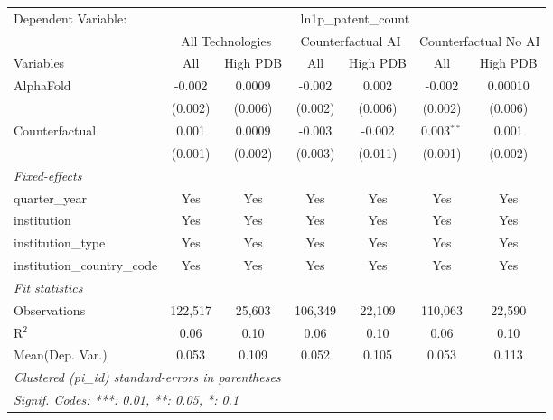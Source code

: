 \begingroup
\centering
\begin{tabular}{lcccccc}
   \tabularnewline \midrule \midrule
   Dependent Variable: & \multicolumn{6}{c}{ln1p\_patent\_count}\\
 & \multicolumn{2}{c}{All Technologies} & \multicolumn{2}{c}{Counterfactual AI} & \multicolumn{2}{c}{Counterfactual No AI} \\
\cmidrule(lr){1-1}\cmidrule(lr){2-3} \cmidrule(lr){4-5} \cmidrule(lr){6-7}
Variables & \multicolumn{1}{c}{All} & \multicolumn{1}{c}{High PDB} & \multicolumn{1}{c}{All} & \multicolumn{1}{c}{High PDB} & \multicolumn{1}{c}{All} & \multicolumn{1}{c}{High PDB} \\
\cmidrule(lr){1-1}\cmidrule(lr){2-2} \cmidrule(lr){3-3} \cmidrule(lr){4-4} \cmidrule(lr){5-5} \cmidrule(lr){6-6} \cmidrule(lr){7-7}
   AlphaFold                    & -0.002  & 0.0009  & -0.002  & 0.002   & -0.002       & 0.00010\\   
                                & (0.002) & (0.006) & (0.002) & (0.006) & (0.002)      & (0.006)\\   
   Counterfactual               & 0.001   & 0.0009  & -0.003  & -0.002  & 0.003$^{**}$ & 0.001\\   
                                & (0.001) & (0.002) & (0.003) & (0.011) & (0.001)      & (0.002)\\   
   \midrule
   \emph{Fixed-effects}\\
   quarter\_year                & Yes     & Yes     & Yes     & Yes     & Yes          & Yes\\  
   institution                  & Yes     & Yes     & Yes     & Yes     & Yes          & Yes\\  
   institution\_type            & Yes     & Yes     & Yes     & Yes     & Yes          & Yes\\  
   institution\_country\_code   & Yes     & Yes     & Yes     & Yes     & Yes          & Yes\\  
   \midrule
   \emph{Fit statistics}\\
   Observations                 & 122,517 & 25,603  & 106,349 & 22,109  & 110,063      & 22,590\\  
   R$^2$                        & 0.06    & 0.10    & 0.06    & 0.10    & 0.06         & 0.10\\  
Mean(Dep. Var.) & 0.053 & 0.109 & 0.052 & 0.105 & 0.053 & 0.113 \\
   \midrule \midrule
   \multicolumn{7}{l}{\emph{Clustered (pi\_id) standard-errors in parentheses}}\\
   \multicolumn{7}{l}{\emph{Signif. Codes: ***: 0.01, **: 0.05, *: 0.1}}\\
\end{tabular}
\par\endgroup
